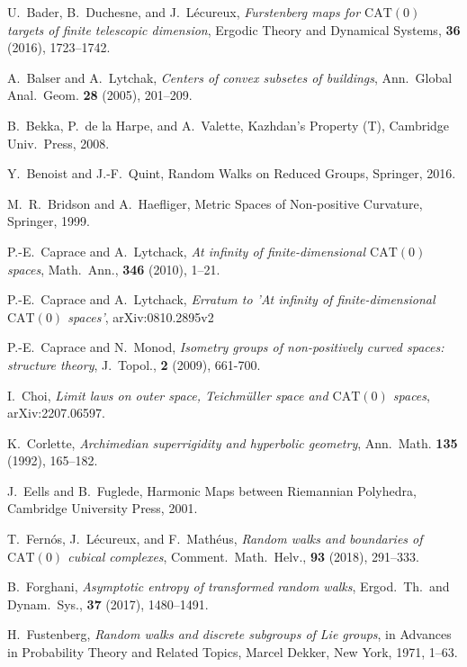\documentclass[12pt]{amsart}
\numberwithin{equation}{section}
\theoremstyle{plain}
\theoremstyle{definition}
\theoremstyle{remark}
\newcommand{\cat}[1]{\mathrm{CAT}(#1)}
\begin{document}
\begin{thebibliography}{99}
U.~Bader, B.~Duchesne, and
J.~L\'ecureux, {\it Furstenberg maps for $\cat{0}$ targets of finite
telescopic dimension}, Ergodic Theory and Dynamical Systems, {\bf 36}
	(2016), 1723--1742. 

A.~Balser and A.~Lytchak, 
{\it Centers of convex subsetes of buildings}, 
Ann.~Global Anal.~Geom. {\bf 28} (2005), 201--209. 

B.~Bekka, P.~de la Harpe, and A.~Valette,
Kazhdan's Property (T), Cambridge Univ.~Press, 2008. 

Y.~Benoist and J.-F.~Quint, 
Random Walks on Reduced Groups, Springer, 2016. 

M.~R.~Bridson and A.~Haefliger, 
Metric Spaces of Non-positive Curvature, Springer, 1999. 

P.-E.~Caprace and A.~Lytchack, {\it At infinity of finite-dimensional
	 $\cat{0}$ spaces}, Math.~Ann., {\bf 346} (2010), 1--21. 

P.-E.~Caprace and A.~Lytchack, {\it Erratum to 'At infinity of
	finite-dimensional $\cat{0}$ spaces'}, arXiv:0810.2895v2


P.-E.~Caprace and N.~Monod, {\it Isometry groups of non-positively
	 curved spaces: structure theory}, J.~Topol., {\bf 2} (2009),
	 661-700. 

I.~Choi, {\it Limit laws on outer space, Teichm\"uller space and
	$\cat{0}$ spaces}, arXiv:2207.06597.

 K.~Corlette,
{\it Archimedian superrigidity and hyperbolic geometry},
Ann.~Math. {\bf 135} (1992), 165--182.

	
J.~Eells and B.~Fuglede,
Harmonic Maps between Riemannian Polyhedra, 
Cambridge University Press, 2001. 

T.~Fern\'os, J.~L\'ecureux, and F.~Math\'eus, 
{\it Random walks and boundaries of $\cat{0}$ cubical complexes}, 
Comment.~Math.~Helv., {\bf 93} (2018), 291--333. 

B.~Forghani, 
{\it Asymptotic entropy of transformed random walks}, Ergod.~Th.~and
	Dynam.~Sys., {\bf 37} (2017), 1480--1491. 

H.~Fustenberg, 
{\it Random walks and discrete subgroups of Lie groups}, in 
Advances in Probability Theory and Related Topics, Marcel Dekker, 
New York, 1971, 1--63. 


\end{thebibliography}
\end{document}
